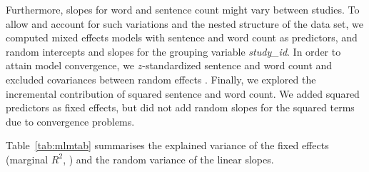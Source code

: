 \documentclass[man,a4paper,mask]{apa6}\usepackage[]{graphicx}\usepackage[]{color}
\begin{document}
Furthermore, slopes for word and sentence count might vary between studies. To allow and account for such variations and the nested structure of the data set, we computed mixed effects models with sentence and word count as predictors, and random intercepts and slopes for the grouping variable \emph{study\_id}. In order to attain model convergence, we $z$-standardized sentence and word count and excluded covariances between random effects \parencite{bates_parsimonious_2015}. Finally, we explored the incremental contribution of squared sentence and word count. We added squared predictors as fixed effects, but did not add random slopes for the squared terms due to convergence problems.

Table~\ref{tab:mlmtab} summarises the explained variance of the fixed effects (marginal $R^2$, ) and the random variance of the linear slopes.
\end{document}
